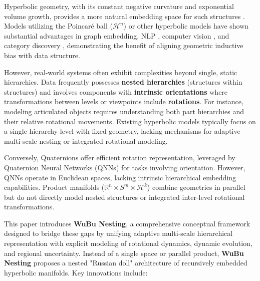 \documentclass[11pt, twoside]{article} %
\newcommand{\R}{\mathbb{R}} %
\newcommand{\wubu}{\textbf{WuBu Nesting}} %
\begin{document}
Hyperbolic geometry, with its constant negative curvature and exponential volume growth, provides a more natural embedding space for such structures \cite{NickelKiela2017, KhrulkovEtAl2020, ErmolovEtAl2022}. Models utilizing the Poincaré ball ($\mathcal{H}^n$) or other hyperbolic models have shown substantial advantages in graph embedding, NLP \cite{GaneaEtAl2018, GulcehreEtAl2019}, computer vision \cite{KhrulkovEtAl2020, ErmolovEtAl2022, AtighEtAl2022}, and category discovery \cite{LiuHeHan2025}, demonstrating the benefit of aligning geometric inductive bias with data structure.

However, real-world systems often exhibit complexities beyond single, static hierarchies. Data frequently possesses \textbf{nested hierarchies} (structures within structures) and involves components with \textbf{intrinsic orientations} where transformations between levels or viewpoints include \textbf{rotations}. For instance, modeling articulated objects requires understanding both part hierarchies and their relative rotational movements. Existing hyperbolic models typically focus on a single hierarchy level with fixed geometry, lacking mechanisms for adaptive multi-scale nesting or integrated rotational modeling.

Conversely, Quaternions \cite{Hamilton1866} offer efficient rotation representation, leveraged by Quaternion Neural Networks (QNNs) \cite{ParcolletEtAl2019, GrassucciEtAl2021} for tasks involving orientation. However, QNNs operate in Euclidean spaces, lacking intrinsic hierarchical embedding capabilities. Product manifolds ($\R^n \times S^m \times \mathcal{H}^k$) \cite{GuEtAl2019} combine geometries in parallel but do not directly model nested structures or integrated inter-level rotational transformations.

This paper introduces \textbf{\wubu{}}, a comprehensive conceptual framework designed to bridge these gaps by unifying adaptive multi-scale hierarchical representation with explicit modeling of rotational dynamics, dynamic evolution, and regional uncertainty. Instead of a single space or parallel product, \wubu{} proposes a nested "Russian doll" architecture of recursively embedded hyperbolic manifolds. Key innovations include:
\end{document}
